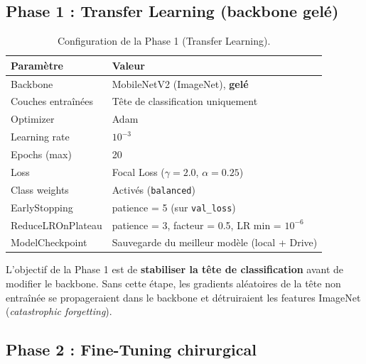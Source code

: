 \documentclass[12pt, a4paper, twoside]{report}
\begin{document}
\subsection{Phase 1 : Transfer Learning (backbone gelé)}

\begin{table}[H]
\centering
\caption{Configuration de la Phase 1 (Transfer Learning).}
\label{tab:phase1-config}
\begin{tabular}{ll}
\toprule
\textbf{Paramètre}     & \textbf{Valeur} \\
\midrule
Backbone                & MobileNetV2 (ImageNet), \textbf{gelé} \\
Couches entraînées      & Tête de classification uniquement \\
Optimizer               & Adam \\
Learning rate           & $10^{-3}$ \\
Epochs (max)            & 20 \\
Loss                    & Focal Loss ($\gamma=2.0$, $\alpha=0.25$) \\
Class weights           & Activés (\texttt{balanced}) \\
EarlyStopping           & patience = 5 (sur \texttt{val\_loss}) \\
ReduceLROnPlateau       & patience = 3, facteur = 0.5, LR min = $10^{-6}$ \\
ModelCheckpoint         & Sauvegarde du meilleur modèle (local + Drive) \\
\bottomrule
\end{tabular}
\end{table}

L'objectif de la Phase 1 est de \textbf{stabiliser la tête de classification} avant de modifier le backbone. Sans cette étape, les gradients aléatoires de la tête non entraînée se propageraient dans le backbone et détruiraient les features ImageNet (\textit{catastrophic forgetting}).

\subsection{Phase 2 : Fine-Tuning chirurgical}
\end{document}
